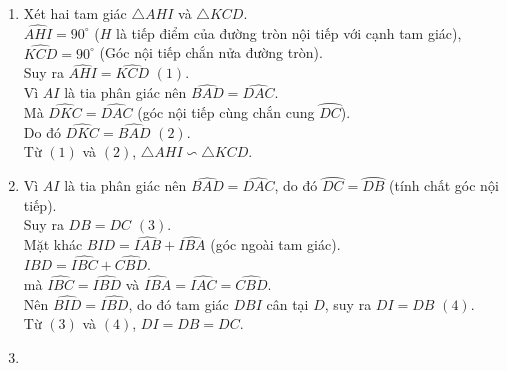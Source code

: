 \begin{bt}
{	\begin{enumerate}
		\item Xét hai tam giác $\triangle AHI$ và $\triangle KCD$.\\
		$\widehat{AHI}=90^\circ$ ($H$ là tiếp điểm của đường tròn nội tiếp với cạnh tam giác),\\
		$\widehat{KCD}=90^\circ$ (Góc nội tiếp chắn nửa đường tròn).\\
		Suy ra $\widehat{AHI}=\widehat{KCD}$ \qquad  $(1)$.\\
		Vì $AI$ là tia phân giác nên $\widehat{BAD}=\widehat{DAC}$.\\
		Mà $\widehat{DKC}=\widehat{DAC}$ (góc nội tiếp cùng chắn cung $\wideparen{DC}$).\\
		Do đó $\widehat{DKC}=\widehat{BAD}$ \qquad $(2)$.\\
		Từ $(1)$ và $(2)$, $\triangle AHI\backsim \triangle KCD$.
		\item Vì $AI$ là tia phân giác nên $\widehat{BAD}=\widehat{DAC}$, do đó $\wideparen{DC}=\wideparen{DB}$ (tính chất góc nội tiếp).\\
		 Suy ra $DB=DC$ \qquad $(3)$.\\
		 Mặt khác $\widehat{BID}=\widehat{IAB}+\widehat{IBA}$ (góc ngoài tam giác).\\
		 $\widehat{IBD}=\widehat{IBC}+\widehat{CBD}$.\\
		 mà $\widehat{IBC}=\widehat{IBD}$ và $\widehat{IBA}=\widehat{IAC}=\widehat{CBD}$.\\
		 Nên $\widehat{BID}=\widehat{IBD}$, do đó tam giác $DBI$ cân tại $D$, suy ra $DI=DB$ \quad $(4)$.\\
		 Từ $(3)$ và $(4)$, $DI=DB=DC$.
		\item {}
\end{enumerate}}
\end{bt}
